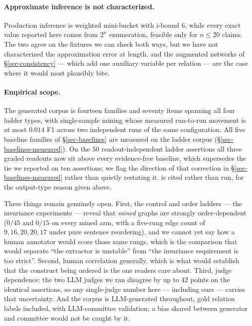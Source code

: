 \paragraph{Approximate inference is not characterized.} Production inference is weighted mini-bucket
with i-bound $6$, while every exact value reported here comes from $2^n$ enumeration, feasible only for
$n\le20$ claims. The two agree on the fixtures we can check both ways, but we have not characterized
the approximation error at length, and the augmented networks of \S\ref{sec-consistency} --- which add
one auxiliary variable per relation --- are the case where it would most plausibly bite.

\paragraph{Empirical scope.} The generated corpus is fourteen families and seventy items spanning all
four ladder types, with single-sample mining whose measured run-to-run movement is at most $0.014$ F1
across two independent runs of the same configuration. All five baseline families of
\S\ref{sec-baselines} are measured on the ladder corpus (\S\ref{sec-baselines-measured}). On the $50$ readout-independent ladder assertions all three graded
readouts now sit above every evidence-free baseline, which supersedes the tie we reported on ten
assertions; we flag the direction of that correction in \S\ref{sec-baselines-measured} rather than
quietly restating it. \citet{liustrube} is cited rather than run, for the output-type reason given
above.

Three things remain genuinely open. First, the control and order ladders --- the invariance
experiments --- reveal that \emph{mined} graphs are strongly order-dependent ($0/45$ and $0/15$ on
every mined arm, with a five-rung edge count of $9,16,20,20,17$ under pure sentence reordering), and we
cannot yet say how a human annotator would score those same rungs, which is the comparison that would
separate ``the extractor is unstable'' from ``the invariance requirement is too strict''. Second,
human correlation generally, which is what would establish that the construct being ordered is the one
readers care about. Third, judge dependence: the two LLM judges we ran disagree by up to $42$ points
on the identical assertions, so any single-judge number here --- including ours --- carries that
uncertainty. And the corpus is LLM-generated throughout, gold relation labels included, with
LLM-committee validation; a bias shared between generator and committee would not be caught by it.

